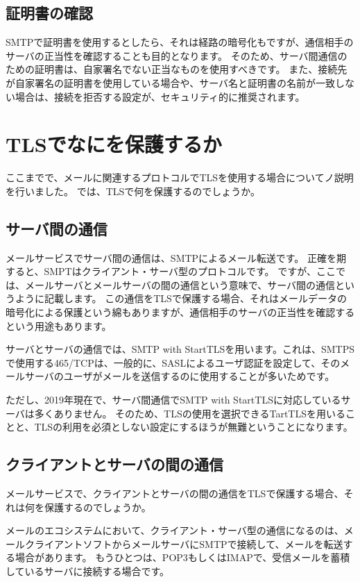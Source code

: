 \subsection{証明書の確認}

SMTPで証明書を使用するとしたら、それは経路の暗号化もですが、通信相手のサーバの正当性を確認することも目的となります。
そのため、サーバ間通信のための証明書は、自家署名でない正当なものを使用すべきです。
また、接続先が自家署名の証明書を使用している場合や、サーバ名と証明書の名前が一致しない場合は、接続を拒否する設定が、セキュリティ的に推奨されます。



\section{TLSでなにを保護するか}

ここまでで、メールに関連するプロトコルでTLSを使用する場合についてノ説明を行いました。
では、TLSで何を保護するのでしょうか。

\subsection{サーバ間の通信}

メールサービスでサーバ間の通信は、SMTPによるメール転送です。
正確を期すると、SMPTはクライアント・サーバ型のプロトコルです。
ですが、ここでは、メールサーバとメールサーバの間の通信という意味で、サーバ間の通信というように記載します。
この通信をTLSで保護する場合、それはメールデータの暗号化による保護という綿もありますが、通信相手のサーバの正当性を確認するという用途もあります。

サーバとサーバの通信では、SMTP with StartTLSを用います。これは、SMTPSで使用する465/TCPは、一般的に、SASLによるユーザ認証を設定して、そのメールサーバのユーザがメールを送信するのに使用することが多いためです。

ただし、2019年現在で、サーバ間通信でSMTP with StartTLSに対応しているサーバは多くありません。
そのため、TLSの使用を選択できるTartTLSを用いることと、TLSの利用を必須としない設定にするほうが無難ということになります。


\subsection{クライアントとサーバの間の通信}

メールサービスで、クライアントとサーバの間の通信をTLSで保護する場合、それは何を保護するのでしょうか。

メールのエコシステムにおいて、クライアント・サーバ型の通信になるのは、メールクライアントソフトからメールサーバにSMTPで接続して、メールを転送する場合があります。
もうひとつは、POP3もしくはIMAPで、受信メールを蓄積しているサーバに接続する場合です。

